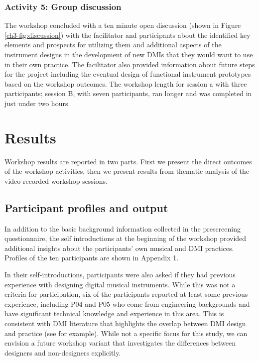 \documentclass[letterpaper, 12pt]{article}
\begin{document}
\subsubsection{Activity 5: Group discussion}
\label{ch3-sec:activity-5-group-discussion}

The workshop concluded with a ten minute open discussion (shown in Figure \ref{ch3-fig:discussion}) with the facilitator and participants about the identified key elements and prospects for utilizing them and additional aspects of the instrument designs in the development of new DMIs that they would want to use in their own practice. The facilitator also provided information about future steps for the project including the eventual design of functional instrument prototypes based on the workshop outcomes. The workshop length for session a with three participants; session B, with seven participants, ran longer and was completed in just under two hours. 

\section{Results}
\label{ch3-sec:results}

Workshop results are reported in two parts. First we present the direct outcomes of the workshop activities, then we present results from thematic analysis of the video recorded workshop sessions. 

\subsection{Participant profiles and output}
\label{ch3-sec:participant-profiles-and-output}

In addition to the basic background information collected in the prescreening questionnaire, the self introductions at the beginning of the workshop provided additional insights about the participants' own musical and DMI practices. Profiles of the ten participants are shown in Appendix 1.

In their self-introductions, participants were also asked if they had previous experience with designing digital musical instruments. While this was not a criteria for participation, six of the participants reported at least some previous experience, including P04 and P05 who come from engineering backgrounds and have significant technical knowledge and experience in this area. This is consistent with DMI literature that highlights the overlap between DMI design and practice (see \citet{Magnusson2008, Morreale2017, Morreale2018} for example). While not a specific focus for this study, we can envision a future workshop variant that investigates the differences between designers and non-designers explicitly.
\end{document}
